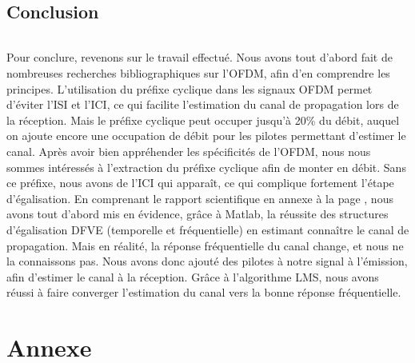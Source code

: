 \documentclass[a4paper, 11pt, oneside, oldfontcommands]{memoir}
\newcounter{th}[chapter]
\begin{document}
\chapter*{Conclusion}
\paragraph{}
Pour conclure, revenons sur le travail effectué. Nous avons tout d'abord fait de
nombreuses recherches bibliographiques sur l'OFDM, afin d'en comprendre les
principes. L'utilisation du préfixe cyclique dans les signaux OFDM permet
d'éviter l'ISI et l'ICI, ce qui facilite l'estimation du canal de propagation
lors de la réception. Mais le préfixe cyclique peut occuper jusqu'à 20\% du
débit, auquel on ajoute encore une occupation de débit pour les pilotes
permettant d'estimer le canal. Après avoir bien appréhender les spécificités de
l'OFDM, nous nous sommes intéressés à l'extraction du préfixe cyclique afin de
monter en débit. Sans ce préfixe, nous avons de l'ICI qui apparaît, ce qui
complique fortement l'étape d'égalisation. En comprenant le rapport scientifique
\cite{sujet} en annexe à la page \pageref{annexe}, nous avons tout d'abord mis
en évidence, grâce à Matlab, la réussite des structures d'égalisation DFVE
(temporelle et fréquentielle) en estimant connaître le canal de propagation.
Mais en réalité, la réponse fréquentielle du canal change, et nous ne la
connaissons pas. Nous avons donc ajouté des pilotes à notre signal à l'émission,
afin d'estimer le canal à la réception. Grâce à l'algorithme LMS, nous avons
réussi à faire converger l'estimation du canal vers la bonne réponse
fréquentielle.






\newpage


\part*{Annexe}
\label{annexe}
\appendix
\nocite{*}

\newpage
 \listoffigures
 \printindex
 
  
\end{document}
